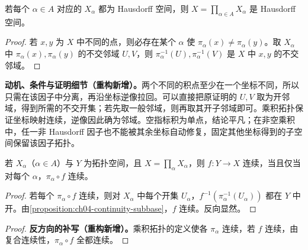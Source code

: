 \documentclass[../../main.tex]{subfiles}%
\begin{document}
\begin{proposition}\label{proposition:ch04-hausdorff-product}
若每个 $\alpha\in A$ 对应的 $X_\alpha$ 都为 Hausdorff 空间，则 $X=\prod_{\alpha\in A}X_\alpha$ 是 Hausdorff 空间。
\end{proposition}
\begin{proof}
若 $x,y$ 为 $X$ 中不同的点，则必存在某个 $\alpha$ 使 $\pi_\alpha(x)\ne\pi_\alpha(y)$。取 $X_\alpha$ 中 $\pi_\alpha(x),\pi_\alpha(y)$ 的不交邻域 $U,V$，则 $\pi_\alpha^{-1}(U),\pi_\alpha^{-1}(V)$ 是 $X$ 中 $x,y$ 的不交邻域。
\end{proof}
\begin{remark}
\textbf{动机、条件与证明细节（重构新增）。}两个不同的积点至少在一个坐标不同，所以只需在该因子中分离，再沿坐标逆像拉回。可以直接把原证明的 $U,V$ 取为开邻域，得到所需的不交开集；若先取一般邻域，则再取其开子邻域即可。乘积拓扑保证坐标映射连续，逆像因此确为邻域。空指标积为单点，结论平凡；在非空乘积中，任一非 Hausdorff 因子也不能被其余坐标自动修复，固定其他坐标得到的子空间保留该因子拓扑。
\end{remark}
\begin{proposition}\label{proposition:ch04-product-map-continuity}
若 $X_\alpha$（$\alpha\in A$）与 $Y$ 为拓扑空间，且 $X=\prod_\alpha X_\alpha$，则 $f:Y\to X$ 连续，当且仅当对每个 $\alpha$，$\pi_\alpha\circ f$ 连续。
\end{proposition}
\begin{proof}
若每个 $\pi_\alpha\circ f$ 连续，则对 $X_\alpha$ 中每个开集 $U_\alpha$，$f^{-1}(\pi_\alpha^{-1}(U_\alpha))$ 都在 $Y$ 中开。由\cref{proposition:ch04-continuity-subbase}，$f$ 连续。反向显然。
\end{proof}
\begin{proof}
\textbf{反方向的补写（重构新增）。}乘积拓扑的定义使各 $\pi_\alpha$ 连续，若 $f$ 连续，由复合连续性，$\pi_\alpha\circ f$ 全都连续。
\end{proof}
\end{document}
